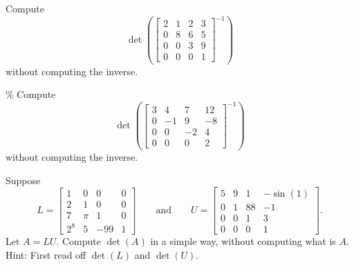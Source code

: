 \documentclass{ximera}
\begin{document}
\begin{exercise}
    Compute
    \begin{equation*}
    \det \left( \begin{bmatrix}
        2 & 1 & 2 & 3 \\
        0 & 8 & 6 & 5 \\
        0 & 0 & 3 & 9 \\
        0 & 0 & 0 & 1
    \end{bmatrix}^{-1}
    \right)
    \end{equation*}
    without computing the inverse.
\end{exercise}

\begin{exercise}\%
    Compute
    \begin{equation*}
    \det \left( \begin{bmatrix}
        3 & 4 & 7 & 12 \\
        0 & -1 & 9 & -8 \\
        0 & 0 & -2 & 4 \\
        0 & 0 & 0 & 2
    \end{bmatrix}^{-1}
    \right)
    \end{equation*}
    without computing the inverse.
\end{exercise}

\begin{exercise}
    Suppose
    \begin{equation*}
        L = \begin{bmatrix}
            1 & 0 & 0 & 0 \\
            2 & 1 & 0 & 0 \\
            7 & \pi & 1 & 0 \\
            2^8 & 5 & -99 & 1
        \end{bmatrix}
        \qquad \text{and} \qquad
        U = \begin{bmatrix}
            5 & 9 & 1 & -\sin(1) \\
            0 & 1 & 88 & -1 \\
            0 & 0 & 1 & 3 \\
            0 & 0 & 0 & 1
        \end{bmatrix} .
    \end{equation*}
    Let $A = LU$.  Compute $\det(A)$ in a simple way, without computing what is $A$. Hint: First read off $\det(L)$ and $\det(U)$.
\end{exercise}
\end{document}
